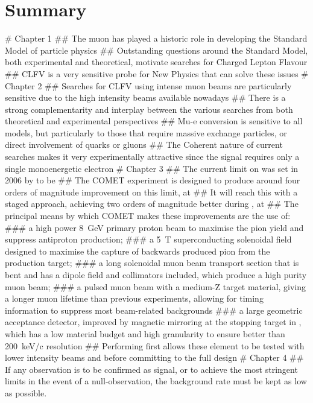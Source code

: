 \chapter{Summary}
\begin{easylist}
# Chapter 1
## The muon has played a historic role in developing the Standard Model of particle physics
## Outstanding questions around the Standard Model, both experimental and theoretical, motivate searches for Charged Lepton Flavour
## CLFV is a very sensitive probe for New Physics that can solve these issues
# Chapter 2
## Searches for CLFV using intense muon beams are particularly sensitive due to the high intensity beams available nowadays 
## There is a strong complementarity and interplay between the various searches from both theoretical and experimental perspectives
## Mu-e conversion is sensitive to all models, but particularly to those that require massive exchange particles, or direct involvement of quarks or gluons
## The Coherent nature of current \mueconv searches makes it very experimentally attractive since the signal requires only a single monoenergetic electron 
# Chapter 3
## The current limit on \mueconv was set in 2006 by \sindrumII to be \senseSindrum
## The COMET experiment is designed to produce around four orders of magnitude improvement on this limit, at \sensePII
## It will reach this with a staged approach, achieving two orders of magnitude better during \phaseI, at \sensePI
## The principal means by which COMET makes these improvements are the use of:
### a high power 8~GeV primary proton beam to maximise the pion yield and suppress antiproton production;
### a 5~T superconducting solenoidal field designed to maximise the capture of backwards produced pion from the production target;
### a long solenoidal muon beam transport section that is bent and has a dipole field and collimators included, which produce a high purity muon beam;
### a pulsed muon beam with a medium-Z target material, giving a longer muon lifetime than previous experiments, allowing for timing information to suppress most beam-related backgrounds
### a large geometric acceptance detector, improved by magnetic mirroring at the stopping target in \phaseII, which has a low material budget and high granularity to ensure better than 200~keV/c resolution
## Performing \phaseI first allows these element to be tested with lower intensity beams and before committing to the full \phaseII design
# Chapter 4
## If any observation is to be confirmed as signal, or to achieve the most stringent limits in the event of a null-observation, the background rate must be kept as low as possible.

\end{easylist}
